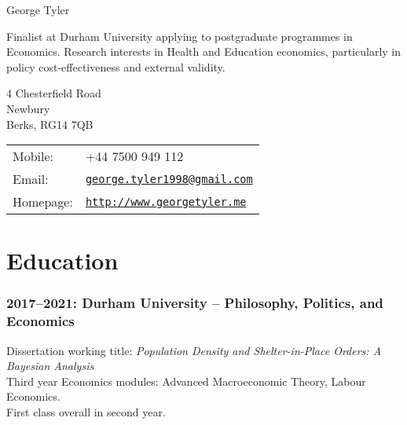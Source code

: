 \documentclass[a4]{article}
\def\name{George Tyler}
\renewenvironment{itemize}{
  \begin{list}{}{
    \setlength{\leftmargin}{1.5em}
  }
}{
  \end{list}
}
\begin{document}
{\huge \name}


\vspace{0.25in}

Finalist at Durham University applying to postgraduate programmes in Economics. Research interests in Health and Education economics, particularly in policy cost-effectiveness and external validity.

\vspace{0.25in}

\begin{minipage}{0.45\linewidth}
  4 Chesterfield Road \\
  Newbury \\
  Berks, RG14 7QB
\end{minipage}
\begin{minipage}{0.45\linewidth}
  \begin{tabular}{ll}
    Mobile: & +44 7500 949 112 \\
    Email: & \href{mailto:george.tyler1998@gmail.com}{\tt george.tyler1998@gmail.com} \\
    Homepage: & \href{http://www.georgetyler.me}{\tt http://www.georgetyler.me} \\
  \end{tabular}
\end{minipage}





\section*{Education}

\subsubsection*{2017--2021: Durham University -- Philosophy, Politics, and Economics}
Dissertation working title: \textit{Population Density and Shelter-in-Place Orders: A Bayesian Analysis} \\
Third year Economics modules: Advanced Macroeconomic Theory, Labour Economics. \\
First class overall in second year.%
\end{document}
